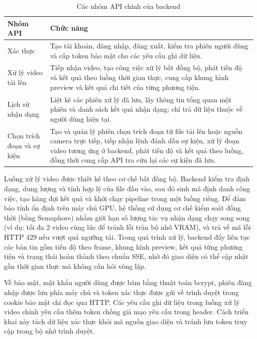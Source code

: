 \documentclass[../DoAn.tex]{subfiles}
\begin{document}
\begin{table}[htbp]
\centering
\renewcommand{\arraystretch}{1.15}
\begin{tabular}{|p{3.6cm}|p{9.8cm}|}
\hline
\textbf{Nhóm API} & \textbf{Chức năng} \\ \hline
Xác thực & Tạo tài khoản, đăng nhập, đăng xuất, kiểm tra phiên người dùng và cấp token bảo mật cho các yêu cầu ghi dữ liệu. \\ \hline
Xử lý video tải lên & Tiếp nhận video, tạo công việc xử lý bất đồng bộ, phát tiến độ và kết quả theo luồng thời gian thực, cung cấp khung hình preview và kết quả chi tiết của từng phương tiện. \\ \hline
Lịch sử nhận dạng & Liệt kê các phiên xử lý đã lưu, lấy thông tin tổng quan một phiên và danh sách kết quả nhận dạng; chỉ trả dữ liệu thuộc về người dùng hiện tại. \\ \hline
Chọn trích đoạn và sự kiện & Tạo và quản lý phiên chọn trích đoạn từ file tải lên hoặc nguồn camera trực tiếp, tiếp nhận lệnh đánh dấu sự kiện, xử lý đoạn video tương ứng ở backend, phát tiến độ và kết quả theo luồng, đồng thời cung cấp API tra cứu lại các sự kiện đã lưu. \\ \hline
\end{tabular}
\caption{Các nhóm API chính của backend}
\label{table:backend_api_groups}
\end{table}

Luồng xử lý video được thiết kế theo cơ chế bất đồng bộ. Backend kiểm tra định dạng, dung lượng và tính hợp lệ của file đầu vào, sau đó sinh mã định danh công việc, tạo hàng đợi kết quả và khởi chạy pipeline trong một luồng riêng. Để đảm bảo tính ổn định trên máy chủ GPU, hệ thống sử dụng cơ chế kiểm soát đồng thời (bằng Semaphore) nhằm giới hạn số lượng tác vụ nhận dạng chạy song song (ví dụ: tối đa 2 video cùng lúc để tránh lỗi tràn bộ nhớ VRAM), và trả về mã lỗi HTTP 429 nếu vượt quá ngưỡng tải. Trong quá trình xử lý, backend đẩy liên tục các bản tin gồm tiến độ theo frame, khung hình preview, kết quả từng phương tiện và trạng thái hoàn thành theo chuẩn SSE, nhờ đó giao diện có thể cập nhật gần thời gian thực mà không cần hỏi vòng lặp.

Về bảo mật, mật khẩu người dùng được băm bằng thuật toán bcrypt, phiên đăng nhập được lưu phía máy chủ và token xác thực được gửi về trình duyệt trong cookie bảo mật chỉ đọc qua HTTP. Các yêu cầu ghi dữ liệu trong luồng xử lý video chính yêu cầu thêm token chống giả mạo yêu cầu trong header. Cách triển khai này tách dữ liệu xác thực khỏi mã nguồn giao diện và tránh lưu token truy cập trong bộ nhớ trình duyệt.
\end{document}
